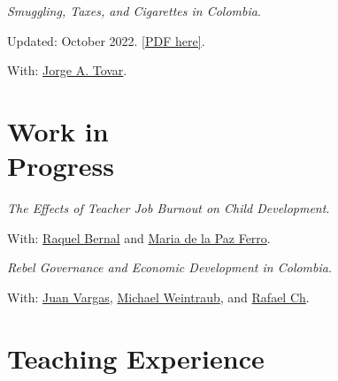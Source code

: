 \documentclass[margin,line]{res}
\newenvironment{list1}{
  \begin{list}{\ding{113}}{%
      \setlength{\itemsep}{0in}
      \setlength{\parsep}{0in} \setlength{\parskip}{0in}
      \setlength{\topsep}{0in} \setlength{\partopsep}{0in} 
      \setlength{\leftmargin}{0.17in}}}{\end{list}}
\begin{document}
\begin{resume}
\textit{Smuggling, Taxes, and Cigarettes in Colombia}.  
\begin{list1}
    \item[] Updated: October 2022.  \href{https://santiago-perezc.github.io/documents/paper-tobacco-draft3.pdf}{[PDF here]}.
    \item[] With: \href{https://sites.google.com/view/jorgetovar/home}{Jorge A. Tovar}.
\end{list1}

\section{\sc Work in \\ Progress}

\textit{The Effects of Teacher Job Burnout on Child Development}.
\begin{list1}
    \item[] With: \href{https://sites.google.com/view/raquelbernal}{Raquel Bernal} and \href{https://economics.ucsd.edu/graduate-program/about/grad-profiles/cohort%202021/Ferro-maria.html}{Maria de la Paz Ferro}.  
\end{list1}

\textit{Rebel Governance and Economic Development in Colombia}.
\begin{list1}
    \item[] With: \href{https://sites.google.com/site/juanfvargas/}{Juan Vargas},  \href{http://www.miweintraub.com/}{Michael Weintraub}, and  \href{https://wp.nyu.edu/rafaelch/}{Rafael Ch}.  
\end{list1}

\section{\sc Teaching Experience}


\end{resume}
\end{document}
